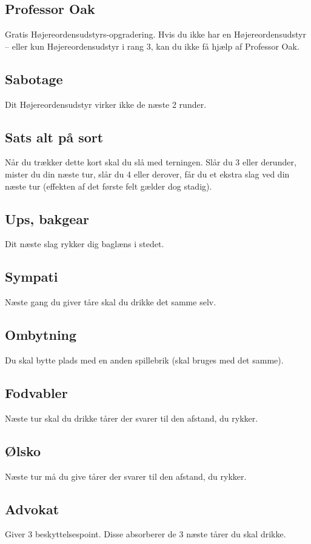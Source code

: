 \documentclass{article}
\begin{document}
\subsection{Professor Oak} 
Gratis Højereordensudstyrs-opgradering. Hvis du ikke har en Højereordensudstyr – eller kun Højereordensudstyr i rang 3, kan du ikke få hjælp af Professor Oak.
 
\subsection{Sabotage} 
Dit Højereordensudstyr virker ikke de næste 2 runder.
 
\subsection{Sats alt på sort} 
Når du trækker dette kort skal du slå med terningen. Slår du 3 eller derunder, mister du din næste tur, slår du 4 eller derover, får du et ekstra slag ved din næste tur (effekten af det første felt gælder dog stadig). 
 
\subsection{Ups, bakgear} 
Dit næste slag rykker dig baglæns i stedet.
 
\subsection{Sympati} 
Næste gang du giver tåre skal du drikke det samme selv.
 
\subsection{Ombytning} 
Du skal bytte plads med en anden spillebrik (skal bruges med det samme).
 
\subsection{Fodvabler} 
Næste tur skal du drikke tårer der svarer til den afstand, du rykker.
 
\subsection{Ølsko} 
Næste tur må du give tårer der svarer til den afstand, du rykker.
 
\subsection{Advokat} 
Giver 3 beskyttelsespoint. Disse absorberer de 3 næste tårer du skal drikke.
 
\end{document}
